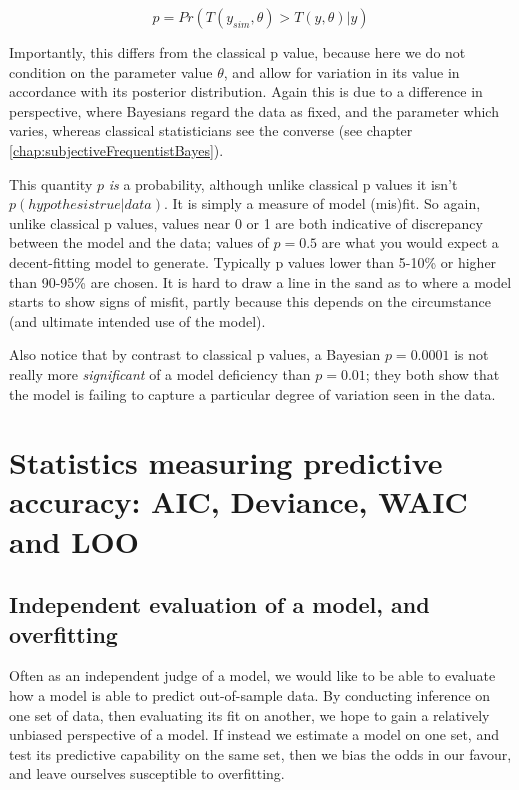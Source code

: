 \documentclass[11pt,fullpage]{book}
\begin{document}
\begin{equation}
p = Pr(T(y_{sim},\theta)>T(y,\theta)|y)
\end{equation}

Importantly, this differs from the classical p value, because here we do not condition on the parameter value $\theta$, and allow for variation in its value in accordance with its posterior distribution. Again this is due to a difference in perspective, where Bayesians regard the data as fixed, and the parameter which varies, whereas classical statisticians see the converse (see chapter \ref{chap:subjectiveFrequentistBayes}).

This quantity $p$ \textit{is} a probability, although unlike classical p values it isn't $p(hypothesis true|data)$. It is simply a measure of model (mis)fit. So again, unlike classical p values, values near 0 or 1 are both indicative of discrepancy between the model and the data; values of $p=0.5$ are what you would expect a decent-fitting model to generate. Typically p values lower than 5-10\% or higher than 90-95\% are chosen. It is hard to draw a line in the sand as to where a model starts to show signs of misfit, partly because this depends on the circumstance (and ultimate intended use of the model).

Also notice that by contrast to classical p values, a Bayesian $p=0.0001$ is not really more \textit{significant} of a model deficiency than $p=0.01$; they both show that the model is failing to capture a particular degree of variation seen in the data.

\section{Statistics measuring predictive accuracy: AIC, Deviance, WAIC and LOO}
\subsection{Independent evaluation of a model, and overfitting}

Often as an independent judge of a model, we would like to be able to evaluate how a model is able to predict out-of-sample data. By conducting inference on one set of data, then evaluating its fit on another, we hope to gain a relatively unbiased perspective of a model. If instead we estimate a model on one set, and test its predictive capability on the same set, then we bias the odds in our favour, and leave ourselves susceptible to overfitting. 
\end{document}
